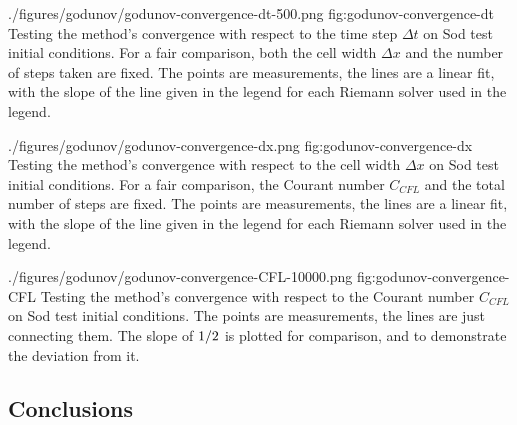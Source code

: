 \quickfigcap
	{./figures/godunov/godunov-convergence-dt-500.png}
	{fig:godunov-convergence-dt}
	{
		Testing the method's convergence with respect to the time step $\Delta t$ on Sod test initial conditions.
		For a fair comparison, both the cell width $\Delta x$ and the number of steps taken are fixed.
		The points are measurements, the lines are a linear fit, with the slope of the line given in the legend for each Riemann solver used in the legend.
	}


\quickfigcap
	{./figures/godunov/godunov-convergence-dx.png}
	{fig:godunov-convergence-dx}
	{
		Testing the method's convergence with respect to the cell width $\Delta x$ on Sod test initial conditions.
		For a fair comparison, the Courant number $C_{CFL}$ and the total number of steps are fixed.
		The points are measurements, the lines are a linear fit, with the slope of the line given in the legend for each Riemann solver used in the legend.
	}
	
\quickfigcap
	{./figures/godunov/godunov-convergence-CFL-10000.png}
	{fig:godunov-convergence-CFL}
	{
		Testing the method's convergence with respect to the Courant number $C_{CFL}$ on Sod test initial conditions.
		The points are measurements, the lines are just connecting them.
		The slope of $1/2$ is plotted for comparison, and to demonstrate the deviation from it.
	}























\subsection{Conclusions}


